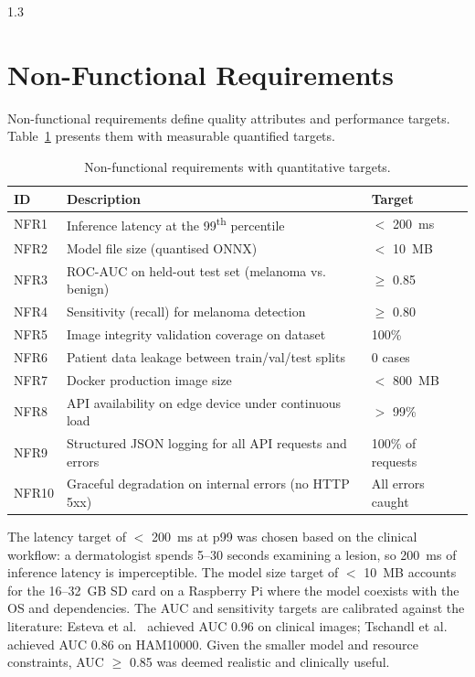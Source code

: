 \begin{spacing}{1.3}
\section{Non-Functional Requirements}

Non-functional requirements define quality attributes and performance targets. Table~\ref{tab:nfr} presents them with measurable quantified targets.

\begin{table}[H]
\centering
\caption{Non-functional requirements with quantitative targets.}
\label{tab:nfr}
\begin{tabular}{p{0.9cm}p{8.5cm}p{3cm}}
\toprule
\textbf{ID} & \textbf{Description} & \textbf{Target} \\
\midrule
NFR1  & Inference latency at the 99\textsuperscript{th} percentile & $<$ 200~ms \\
NFR2  & Model file size (quantised ONNX) & $<$ 10~MB \\
NFR3  & ROC-AUC on held-out test set (melanoma vs. benign) & $\geq$ 0.85 \\
NFR4  & Sensitivity (recall) for melanoma detection & $\geq$ 0.80 \\
NFR5  & Image integrity validation coverage on dataset & 100\% \\
NFR6  & Patient data leakage between train/val/test splits & 0 cases \\
NFR7  & Docker production image size & $<$ 800~MB \\
NFR8  & API availability on edge device under continuous load & $>$ 99\% \\
NFR9  & Structured JSON logging for all API requests and errors & 100\% of requests \\
NFR10 & Graceful degradation on internal errors (no HTTP 5xx) & All errors caught \\
\bottomrule
\end{tabular}
\end{table}

The latency target of $<$ 200~ms at p99 was chosen based on the clinical workflow: a dermatologist spends 5--30 seconds examining a lesion, so 200~ms of inference latency is imperceptible. The model size target of $<$ 10~MB accounts for the 16--32~GB SD card on a Raspberry Pi where the model coexists with the OS and dependencies. The AUC and sensitivity targets are calibrated against the literature: Esteva et al.~\cite{esteva2017} achieved AUC 0.96 on clinical images; Tschandl et al.~\cite{tschandl2018} achieved AUC 0.86 on HAM10000. Given the smaller model and resource constraints, AUC $\geq$ 0.85 was deemed realistic and clinically useful.


\end{spacing}
